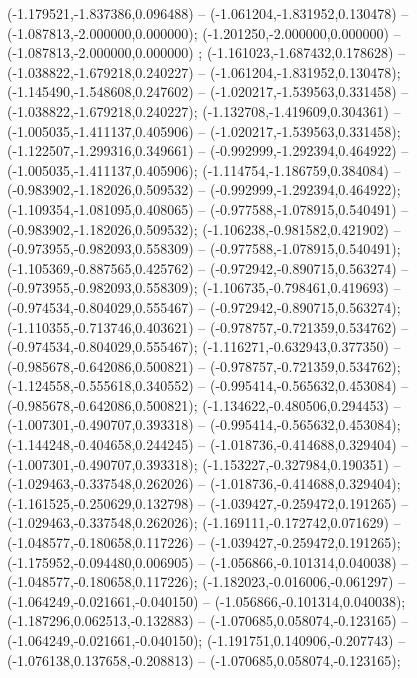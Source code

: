  (-1.179521,-1.837386,0.096488) -- (-1.061204,-1.831952,0.130478) -- (-1.087813,-2.000000,0.000000);
 (-1.201250,-2.000000,0.000000) -- (-1.087813,-2.000000,0.000000) ;
 (-1.161023,-1.687432,0.178628) -- (-1.038822,-1.679218,0.240227) -- (-1.061204,-1.831952,0.130478);
 (-1.145490,-1.548608,0.247602) -- (-1.020217,-1.539563,0.331458) -- (-1.038822,-1.679218,0.240227);
 (-1.132708,-1.419609,0.304361) -- (-1.005035,-1.411137,0.405906) -- (-1.020217,-1.539563,0.331458);
 (-1.122507,-1.299316,0.349661) -- (-0.992999,-1.292394,0.464922) -- (-1.005035,-1.411137,0.405906);
 (-1.114754,-1.186759,0.384084) -- (-0.983902,-1.182026,0.509532) -- (-0.992999,-1.292394,0.464922);
 (-1.109354,-1.081095,0.408065) -- (-0.977588,-1.078915,0.540491) -- (-0.983902,-1.182026,0.509532);
 (-1.106238,-0.981582,0.421902) -- (-0.973955,-0.982093,0.558309) -- (-0.977588,-1.078915,0.540491);
 (-1.105369,-0.887565,0.425762) -- (-0.972942,-0.890715,0.563274) -- (-0.973955,-0.982093,0.558309);
 (-1.106735,-0.798461,0.419693) -- (-0.974534,-0.804029,0.555467) -- (-0.972942,-0.890715,0.563274);
 (-1.110355,-0.713746,0.403621) -- (-0.978757,-0.721359,0.534762) -- (-0.974534,-0.804029,0.555467);
 (-1.116271,-0.632943,0.377350) -- (-0.985678,-0.642086,0.500821) -- (-0.978757,-0.721359,0.534762);
 (-1.124558,-0.555618,0.340552) -- (-0.995414,-0.565632,0.453084) -- (-0.985678,-0.642086,0.500821);
 (-1.134622,-0.480506,0.294453) -- (-1.007301,-0.490707,0.393318) -- (-0.995414,-0.565632,0.453084);
 (-1.144248,-0.404658,0.244245) -- (-1.018736,-0.414688,0.329404) -- (-1.007301,-0.490707,0.393318);
 (-1.153227,-0.327984,0.190351) -- (-1.029463,-0.337548,0.262026) -- (-1.018736,-0.414688,0.329404);
 (-1.161525,-0.250629,0.132798) -- (-1.039427,-0.259472,0.191265) -- (-1.029463,-0.337548,0.262026);
 (-1.169111,-0.172742,0.071629) -- (-1.048577,-0.180658,0.117226) -- (-1.039427,-0.259472,0.191265);
 (-1.175952,-0.094480,0.006905) -- (-1.056866,-0.101314,0.040038) -- (-1.048577,-0.180658,0.117226);
 (-1.182023,-0.016006,-0.061297) -- (-1.064249,-0.021661,-0.040150) -- (-1.056866,-0.101314,0.040038);
 (-1.187296,0.062513,-0.132883) -- (-1.070685,0.058074,-0.123165) -- (-1.064249,-0.021661,-0.040150);
 (-1.191751,0.140906,-0.207743) -- (-1.076138,0.137658,-0.208813) -- (-1.070685,0.058074,-0.123165);

